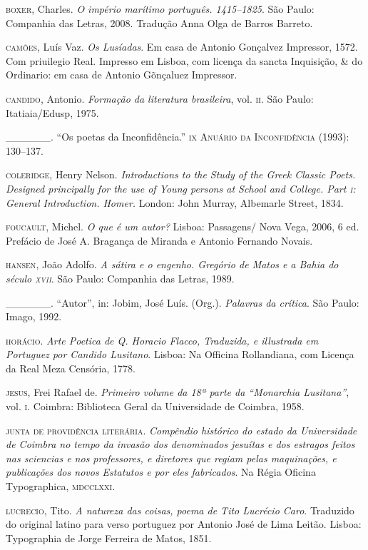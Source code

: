 \begin{Parskip}
\textsc{boxer}, Charles. \emph{O império marítimo português. 1415--1825}. São
Paulo: Companhia das Letras, 2008. Tradução Anna Olga de
Barros Barreto.

\textsc{camões}, Luís Vaz. \emph{Os Lusíadas}. Em casa de Antonio Gonçalvez
Impressor, 1572. Com priuilegio Real. Impresso em Lisboa,
com licença da sancta Inquisição, \& do Ordinario: em casa de
Antonio Gõnçaluez Impressor.

\textsc{candido}, Antonio. \emph{Formação da literatura brasileira}, vol. \textsc{ii}. São
Paulo: Itatiaia/Edusp, 1975.

\_\_\_\_\_\_. “Os poetas da Inconfidência.” \textsc{ix} \textsc{Anuário da Inconfidência} (1993): 130--137.


\textsc{coleridge}, Henry Nelson. \emph{Introductions to the Study of the
Greek Classic Poets. Designed principally for the use of Young
persons at School and College. Part \textsc{i}: General Introduction. Homer.} London: John Murray, Albemarle Street, 1834.

\textsc{foucault}, Michel. \emph{O que é um autor?} Lisboa: Passagens/ Nova
Vega, 2006, 6 ed. Prefácio de José A. Bragança de Miranda e
Antonio Fernando Novais.

\textsc{hansen}, João Adolfo. \emph{A sátira e o engenho. Gregório de Matos e
a Bahia do século \textsc{xvii}}. São Paulo: Companhia das Letras, 1989.

\_\_\_\_\_\_. “Autor”, in: Jobim, José Luís. (Org.). \emph{Palavras da
crítica}. São Paulo: Imago, 1992.

\textsc{horácio}. \emph{Arte Poetica de Q. Horacio Flacco, Traduzida, e illustrada em Portuguez por Candido Lusitano}. Lisboa: Na Officina
Rollandiana, com Licença da Real Meza Censória, 1778.

\textsc{jesus}, Frei Rafael de. \emph{Primeiro volume da 18ª parte da “Monarchia Lusitana”}, vol. \textsc{i}. Coimbra: Biblioteca Geral da Universidade de Coimbra, 1958.

\textsc{junta de providência literária}. \emph{Compêndio histórico do estado
da Universidade de Coimbra no tempo da invasão dos denominados jesuítas e dos estragos feitos nas sciencias e nos professores, e
diretores que regiam pelas maquinações, e publicações dos novos
Estatutos e por eles fabricados}. Na Régia Oficina Typographica,
\textsc{mdcclxxi}.

\textsc{lucrecio}, Tito. \emph{A natureza das coisas, poema de Tito Lucrécio
Caro}. Traduzido do original latino para verso portuguez por
Antonio José de Lima Leitão. Lisboa: Typographia de Jorge
Ferreira de Matos, 1851.


\end{Parskip}
